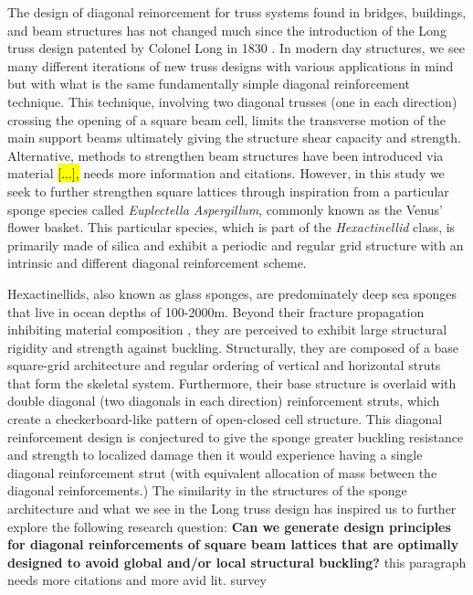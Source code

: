 \documentclass[9pt,twocolumn,twoside]{fernandes_paper}
\newcommand{\mf}[1]{\colorbox{blue!10}{\color{color3}#1}}
\begin{document}
The design of diagonal reinorcement for truss systems found in bridges, buildings, and beam structures has not changed much since the introduction of the Long truss design patented by Colonel Long in 1830 \citep{waddell1916}. In modern day structures, we see many different iterations of new truss designs with various applications in mind but with what is the same fundamentally simple diagonal reinforcement technique. This technique, involving two diagonal trusses (one in each direction) crossing the opening of a square beam cell, limits the transverse motion of the main support beams ultimately giving the structure shear capacity and strength. Alternative, methods to strengthen beam structures have been introduced via material \hl{[...],} \mf{needs more information and citations}. However, in this study we seek to further strengthen square lattices through inspiration from a particular sponge species called \textit{Euplectella Aspergillum}, commonly known as the Venus' flower basket. This particular species, which is part of the \textit{Hexactinellid} class, is primarily made of silica and exhibit a periodic and regular grid structure with an intrinsic and different diagonal reinforcement scheme. 

Hexactinellids, also known as glass sponges, are predominately deep sea sponges that live in ocean depths of 100-2000m. Beyond their fracture propagation inhibiting material composition \citep{weaver2007}, they are perceived to exhibit large structural rigidity and strength against buckling. 
Structurally, they are composed of a base square-grid architecture and regular ordering of vertical and horizontal struts that form the skeletal system. Furthermore, their base structure is overlaid with double diagonal (two diagonals in each direction) reinforcement struts, which create a checkerboard-like pattern of open-closed cell structure. This diagonal reinforcement design is conjectured to give the sponge greater buckling resistance and strength to localized damage then it would experience having a single diagonal reinforcement strut (with equivalent allocation of mass between the diagonal reinforcements.) 
The similarity in the structures of the sponge architecture and what we see in the Long truss design has inspired us to further explore the following research question: \textbf{Can we generate design principles for diagonal reinforcements of square beam lattices that are optimally designed to avoid global and/or local structural buckling?} \mf{this paragraph needs more citations and more avid lit. survey}
\end{document}
